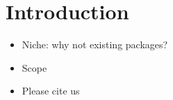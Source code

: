 % 

\chapter{Introduction}

\begin{itemize}
    \item Niche: why not existing packages?
    \item Scope
    \item Please cite us
\end{itemize}
